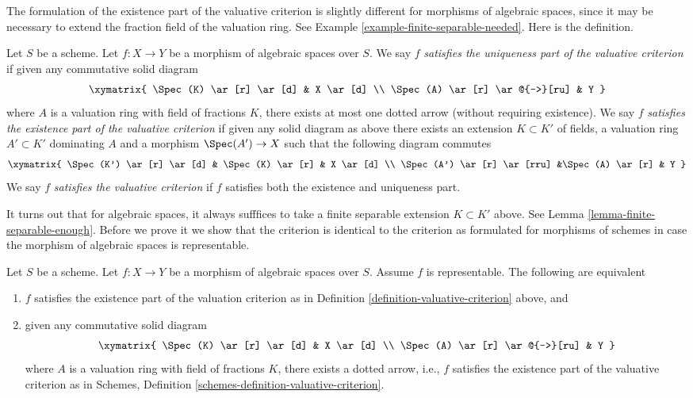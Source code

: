 \noindent
The formulation of the existence part of the valuative criterion is
slightly different for morphisms of algebraic spaces, since it may be
necessary to extend the fraction field of the valuation ring.
See Example \ref{example-finite-separable-needed}. Here is the definition.

\begin{definition}
\label{definition-valuative-criterion}
Let $S$ be a scheme.
Let $f : X \to Y$ be a morphism of algebraic spaces over $S$.
We say $f$ {\it satisfies the uniqueness part of the valuative criterion}
if given any commutative solid diagram
$$
\xymatrix{
\Spec(K) \ar[r] \ar[d] & X \ar[d] \\
\Spec(A) \ar[r] \ar@{-->}[ru] & Y
}
$$
where $A$ is a valuation ring with field of fractions $K$, there exists
at most one dotted arrow (without requiring existence).
We say $f$ {\it satisfies the existence part of the valuative criterion}
if given any solid diagram as above there exists an extension
$K \subset K'$ of fields, a valuation ring $A' \subset K'$ dominating
$A$ and a morphism $\Spec(A') \to X$ such that the following
diagram commutes
$$
\xymatrix{
\Spec(K') \ar[r] \ar[d] & \Spec(K) \ar[r] & X \ar[d] \\
\Spec(A') \ar[r] \ar[rru] &\Spec(A) \ar[r] & Y
}
$$
We say $f$ {\it satisfies the valuative criterion}
if $f$ satisfies both the existence and uniqueness part.
\end{definition}

\noindent
It turns out that for algebraic spaces, it always sufffices to
take a finite separable extension $K \subset K'$ above.
See Lemma \ref{lemma-finite-separable-enough}.
Before we prove it we show that the criterion
is identical to the criterion as formulated for morphisms of schemes
in case the morphism of algebraic spaces is representable.

\begin{lemma}
\label{lemma-valuative-criterion-representable}
Let $S$ be a scheme.
Let $f : X \to Y$ be a morphism of algebraic spaces over $S$.
Assume $f$ is representable. The following are equivalent
\begin{enumerate}
\item $f$ satisfies the existence part of the valuation criterion
as in Definition \ref{definition-valuative-criterion} above, and
\item given any commutative solid diagram
$$
\xymatrix{
\Spec(K) \ar[r] \ar[d] & X \ar[d] \\
\Spec(A) \ar[r] \ar@{-->}[ru] & Y
}
$$
where $A$ is a valuation ring with field of fractions $K$, there exists
a dotted arrow, i.e., $f$ satisfies the existence part of the valuative
criterion as in
Schemes, Definition \ref{schemes-definition-valuative-criterion}.
\end{enumerate}
\end{lemma}

